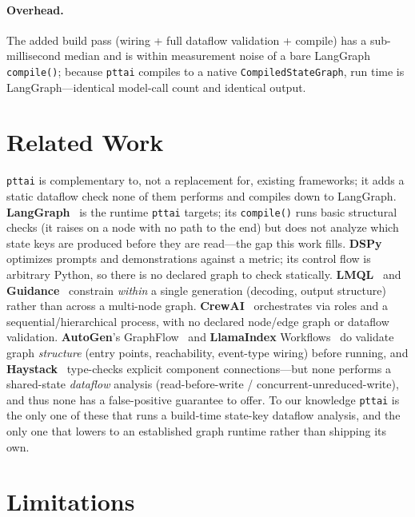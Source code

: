 \documentclass[11pt]{article}
\newcommand{\code}[1]{\texttt{#1}}
\begin{document}
\paragraph{Overhead.} The added build pass (wiring + full dataflow validation +
compile) has a sub-millisecond median and is within measurement noise of a bare
LangGraph \code{compile()}; because \code{pttai} compiles to a native
\code{CompiledStateGraph}, run time is LangGraph---identical model-call count and
identical output.

\section{Related Work}
\label{sec:related}

\code{pttai} is complementary to, not a replacement for, existing frameworks; it
adds a static dataflow check none of them performs and compiles down to
LangGraph. \textbf{LangGraph}~\citep{langgraph} is the runtime \code{pttai}
targets; its \code{compile()} runs basic structural checks (it raises on a node
with no path to the end) but does not analyze which state keys are produced
before they are read---the gap this work fills. \textbf{DSPy}~\citep{dspy}
optimizes prompts and demonstrations against a metric; its control flow is
arbitrary Python, so there is no declared graph to check statically.
\textbf{LMQL}~\citep{lmql} and \textbf{Guidance}~\citep{guidance} constrain
\emph{within} a single generation (decoding, output structure) rather than across
a multi-node graph. \textbf{CrewAI}~\citep{crewai} orchestrates via roles and a
sequential/hierarchical process, with no declared node/edge graph or dataflow
validation. \textbf{AutoGen}'s GraphFlow~\citep{autogen} and
\textbf{LlamaIndex} Workflows~\citep{llamaindex} do validate graph
\emph{structure} (entry points, reachability, event-type wiring) before running,
and \textbf{Haystack}~\citep{haystack} type-checks explicit component
connections---but none performs a shared-state \emph{dataflow} analysis
(read-before-write / concurrent-unreduced-write), and thus none has a
false-positive guarantee to offer. To our knowledge \code{pttai} is the only one
of these that runs a build-time state-key dataflow analysis, and the only one
that lowers to an established graph runtime rather than shipping its own.

\section*{Limitations}
\end{document}

